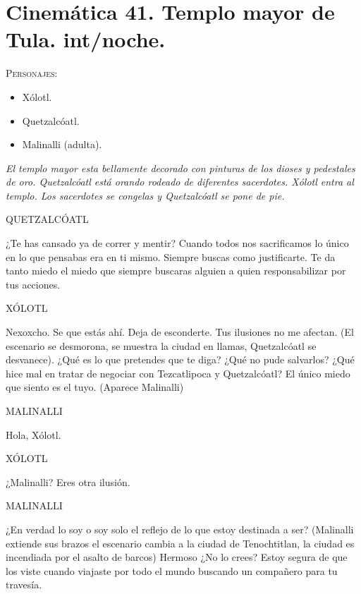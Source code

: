 \documentclass[11pt,letterpaper]{article}
\begin{document}
\section{Cinemática 41. Templo mayor de Tula. int/noche.}
 \textsc{Personajes}:
 \begin{itemize}
 \item Xólotl.
 \item Quetzalcóatl.
 \item Malinalli (adulta).
 \end{itemize}
\textit{El templo mayor esta bellamente decorado con pinturas de los dioses y pedestales de oro. Quetzalcóatl está orando rodeado de diferentes sacerdotes. Xólotl entra al templo. Los sacerdotes se congelas y Quetzalcóatl se pone de pie.}
\begin{center}
QUETZALCÓATL
\\
\par
¿Te has cansado ya de correr y mentir? Cuando todos nos sacrificamos lo único en lo que pensabas era en ti mismo. Siempre buscas como justificarte. Te da tanto miedo el miedo que siempre buscaras alguien a quien responsabilizar por tus acciones.
\\
\par
XÓLOTL
\\
\par
Nexoxcho. Se que estás ahí. Deja de esconderte. Tus ilusiones no me afectan.
(El escenario se desmorona, se muestra la ciudad en llamas, Quetzalcóatl se desvanece).
¿Qué es lo que pretendes que te diga? ¿Qué no pude salvarlos? ¿Qué hice mal en tratar de negociar con Tezcatlipoca y Quetzalcóatl? El único miedo que siento es el tuyo.
(Aparece Malinalli)
\\
\par
MALINALLI
\\
\par
Hola, Xólotl.
\\
\par
XÓLOTL
\\
\par
¿Malinalli? Eres otra ilusión.
\\
\par
MALINALLI
\\
\par
¿En verdad lo soy o soy solo el reflejo de lo que estoy destinada a ser? (Malinalli extiende sus brazos el escenario cambia a la ciudad de Tenochtitlan, la ciudad es incendiada por el asalto de barcos) Hermoso ¿No lo crees? Estoy segura de que los viste cuando viajaste por todo el mundo buscando un compañero para tu travesía.

\end{center}
\end{document}
